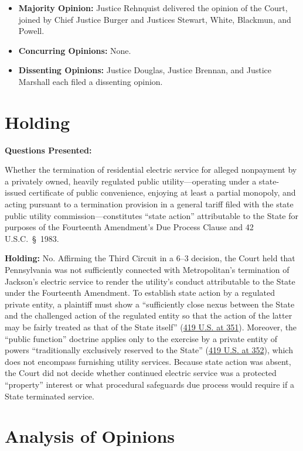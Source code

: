 \documentclass[12pt]{article}
\begin{document}
\begin{itemize}
    \item \textbf{Majority Opinion:} Justice Rehnquist delivered the opinion of the Court, joined by Chief Justice Burger and Justices Stewart, White, Blackmun, and Powell.
    \item \textbf{Concurring Opinions:} None.
    \item \textbf{Dissenting Opinions:} Justice Douglas, Justice Brennan, and Justice Marshall each filed a dissenting opinion.
\end{itemize}

\section{Holding}
\textbf{Questions Presented:}

Whether the termination of residential electric service for alleged nonpayment by a privately owned, heavily regulated public utility---operating under a state-issued certificate of public convenience, enjoying at least a partial monopoly, and acting pursuant to a termination provision in a general tariff filed with the state public utility commission---constitutes ``state action'' attributable to the State for purposes of the Fourteenth Amendment's Due Process Clause and 42 U.S.C.\ \S~1983.

\textbf{Holding:} No. Affirming the Third Circuit in a 6--3 decision, the Court held that Pennsylvania was not sufficiently connected with Metropolitan's termination of Jackson's electric service to render the utility's conduct attributable to the State under the Fourteenth Amendment. To establish state action by a regulated private entity, a plaintiff must show a ``sufficiently close nexus between the State and the challenged action of the regulated entity so that the action of the latter may be fairly treated as that of the State itself'' (\href{https://supreme.justia.com/cases/federal/us/419/345/}{419 U.S. at 351}). Moreover, the ``public function'' doctrine applies only to the exercise by a private entity of powers ``traditionally exclusively reserved to the State'' (\href{https://supreme.justia.com/cases/federal/us/419/345/}{419 U.S. at 352}), which does not encompass furnishing utility services. Because state action was absent, the Court did not decide whether continued electric service was a protected ``property'' interest or what procedural safeguards due process would require if a State terminated service.

\section{Analysis of Opinions}
\end{document}
